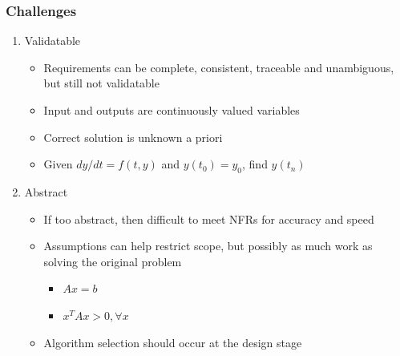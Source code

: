 \documentclass[t,12pt,numbers,fleqn]{beamer}
\newcounter{temp}
\begin{document}
\begin{frame}

\frametitle{Challenges}

\begin{enumerate}
\setcounter{enumi}{\value{temp}}
\item Validatable
\begin{itemize}
\item Requirements can be complete, consistent, traceable and unambiguous, but still not validatable
\item Input and outputs are continuously valued variables
\item Correct solution is unknown a priori %
\item Given $dy/dt = f(t, y)$ and $y(t_0) = y_0$, find $y(t_n)$ 
\end{itemize}
\item Abstract
\begin{itemize}
\item If too abstract, then difficult to meet NFRs for accuracy and speed
\item Assumptions can help restrict scope, but possibly as much work as solving the original problem
\begin{itemize}
\item $A x = b$
\item $x^T A x > 0, \forall x$
\end{itemize}
\item Algorithm selection should occur at the design stage

\end{itemize}

\setcounter{temp}{\value{enumi}}
\end{enumerate}

\end{frame}
\end{document}
